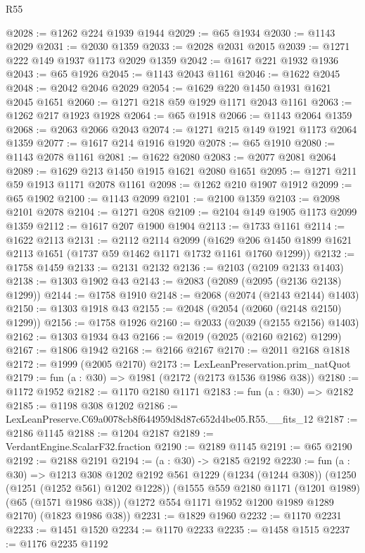 \begin{lexlean}{R55}
\begin{coremodule}
@2028 := @1262 @224 @1939 @1944
@2029 := @65 @1934
@2030 := @1143 @2029
@2031 := @2030 @1359
@2033 := @2028 @2031 @2015
@2039 := @1271 @222 @149 @1937 @1173 @2029 @1359
@2042 := @1617 @221 @1932 @1936
@2043 := @65 @1926
@2045 := @1143 @2043 @1161
@2046 := @1622 @2045
@2048 := @2042 @2046 @2029
@2054 := @1629 @220 @1450 @1931 @1621 @2045 @1651
@2060 := @1271 @218 @59 @1929 @1171 @2043 @1161
@2063 := @1262 @217 @1923 @1928
@2064 := @65 @1918
@2066 := @1143 @2064 @1359
@2068 := @2063 @2066 @2043
@2074 := @1271 @215 @149 @1921 @1173 @2064 @1359
@2077 := @1617 @214 @1916 @1920
@2078 := @65 @1910
@2080 := @1143 @2078 @1161
@2081 := @1622 @2080
@2083 := @2077 @2081 @2064
@2089 := @1629 @213 @1450 @1915 @1621 @2080 @1651
@2095 := @1271 @211 @59 @1913 @1171 @2078 @1161
@2098 := @1262 @210 @1907 @1912
@2099 := @65 @1902
@2100 := @1143 @2099
@2101 := @2100 @1359
@2103 := @2098 @2101 @2078
@2104 := @1271 @208
@2109 := @2104 @149 @1905 @1173 @2099 @1359
@2112 := @1617 @207 @1900 @1904
@2113 := @1733 @1161
@2114 := @1622 @2113
@2131 := @2112
    @2114
    @2099
    (@1629 @206 @1450 @1899 @1621 @2113 @1651 (@1737 @59 @1462 @1171 @1732 @1161 @1760 @1299))
@2132 := @1758 @1459
@2133 := @2131 @2132
@2136 := @2103 (@2109 @2133 @1403)
@2138 := @1303 @1902 @43
@2143 := @2083 (@2089 (@2095 (@2136 @2138) @1299))
@2144 := @1758 @1910
@2148 := @2068 (@2074 (@2143 @2144) @1403)
@2150 := @1303 @1918 @43
@2155 := @2048 (@2054 (@2060 (@2148 @2150) @1299))
@2156 := @1758 @1926
@2160 := @2033 (@2039 (@2155 @2156) @1403)
@2162 := @1303 @1934 @43
@2166 := @2019 (@2025 (@2160 @2162) @1299)
@2167 := @1806 @1942
@2168 := @2166 @2167
@2170 := @2011 @2168 @1818
@2172 := @1999 (@2005 @2170)
@2173 := LexLeanPreservation.prim_natQuot
@2179 := fun (a : @30) => @1981 (@2172 (@2173 @1536 @1986 @38))
@2180 := @1172 @1952
@2182 := @1170 @2180 @1171
@2183 := fun (a : @30) => @2182
@2185 := @1198 @308 @1202
@2186 := LexLeanPreserve.C69a0078cb8f644959d8d87c652d4be05.R55.__fits_12
@2187 := @2186 @1145
@2188 := @1204 @2187
@2189 := VerdantEngine.ScalarF32.fraction
@2190 := @2189 @1145
@2191 := @65 @2190
@2192 := @2188 @2191
@2194 := (a : @30) -> @2185 @2192
@2230 := fun (a : @30) =>
  @1213
    @308
    @1202
    @2192
    @561
    @1229
    (@1234 (@1244 @308))
    (@1250 (@1251 (@1252 @561) @1202 @1228))
    (@1555
      @559
      @2180
      @1171
      (@1201 @1989)
      (@65 (@1571 @1986 @38))
      (@1272 @554 @1171 @1952 @1200 @1989 @1289 @2170)
      (@1823 @1986 @38))
@2231 := @1829 @1960
@2232 := @1170 @2231
@2233 := @1451 @1520
@2234 := @1170 @2233
@2235 := @1458 @1515
@2237 := @1176 @2235 @1192

\end{coremodule}
\end{lexlean}

